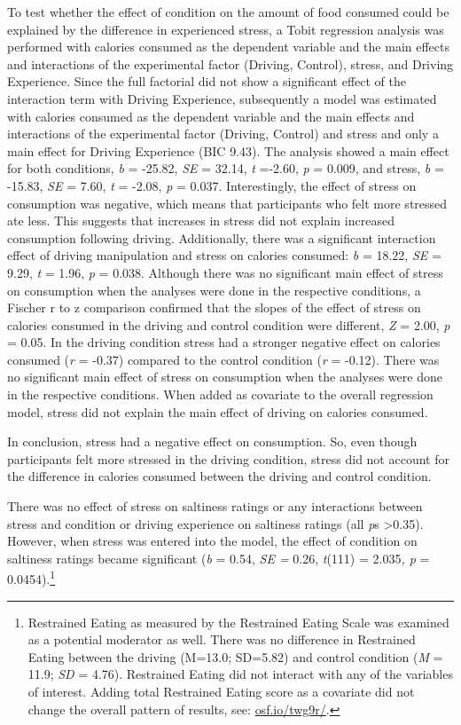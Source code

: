 \documentclass[authordate, empirical]{jote-new-article}
\begin{document}
To test whether the effect of condition on the amount of food consumed could be explained by the difference in experienced stress, a Tobit regression analysis was performed with calories consumed as the dependent variable and the main effects and interactions of the experimental factor (Driving, Control), stress, and Driving Experience. Since the full factorial did not show a significant effect of the interaction term with Driving Experience, subsequently a model was estimated with calories consumed as the dependent variable and the main effects and interactions of the experimental factor (Driving, Control) and stress and only a main effect for Driving Experience (BIC 9.43). The analysis showed a main effect for both conditions, \emph{b }= -25.82, \emph{SE }= 32.14, \emph{t }=-2.60, \emph{p }= 0.009, and stress, \emph{b }= -15.83, \emph{SE }= 7.60, \emph{t }= -2.08, \emph{p }= 0.037. Interestingly, the effect of stress on consumption was negative, which means that participants who felt more stressed ate less. This suggests that increases in stress did not explain increased consumption following driving. Additionally, there was a significant interaction effect of driving manipulation and stress on calories consumed: \emph{b }= 18.22, \emph{SE }= 9.29, \emph{t }= 1.96, \emph{p }= 0.038. Although there was no significant main effect of stress on consumption when the analyses were done in the respective conditions, a Fischer r to z comparison confirmed that the slopes of the effect of stress on calories consumed in the driving and control condition were different, \emph{Z} = 2.00, \emph{p} = 0.05. In the driving condition stress had a stronger negative effect on calories consumed (\emph{r} = -0.37) compared to the control condition (\emph{r }= -0.12). There was no significant main effect of stress on consumption when the analyses were done in the respective conditions. When added as covariate to the overall regression model, stress did not explain the main effect of driving on calories consumed.



In conclusion, stress had a negative effect on consumption. So, even though participants felt more stressed in the driving condition, stress did not account for the difference in calories consumed between the driving and control condition.



There was no effect of stress on saltiness ratings or any interactions between stress and condition or driving experience on saltiness ratings (all \emph{p}s >0.35). However, when stress was entered into the model, the effect of condition on saltiness ratings became significant (\emph{b }= 0.54, \emph{SE = }0.26, \emph{t}(111) = 2.035\emph{, p }= 0.0454).\footnote{ Restrained Eating as measured by the Restrained Eating Scale \parencites{Polivy1978} was examined as a potential moderator as well. There was no difference in Restrained Eating between the driving (M=13.0; SD=5.82) and control condition (\emph{M} = 11.9; \emph{SD} = 4.76). Restrained Eating did not interact with any of the variables of interest. Adding total Restrained Eating score as a covariate did not change the overall pattern of results, see: \href{https://osf.io/twg9r/}{osf.io/twg9r/}.}
\end{document}
